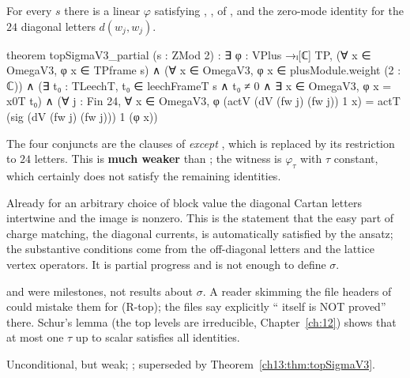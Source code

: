 \begin{theorem}\label{ch13:thm:partial}
For every $s$ there is a linear $\varphi$ satisfying , ,
 of , and the zero-mode identity for the $24$ diagonal letters
$d(w_j,w_j)$.
\end{theorem}
\begin{leancode}
theorem topSigmaV3_partial (s : ZMod 2) :
    ∃ φ : VPlus →ₗ[ℂ] TP, (∀ x ∈ OmegaV3, φ x ∈ TPframe s) ∧
      (∀ x ∈ OmegaV3, φ x ∈ plusModule.weight (2 : ℂ)) ∧
      (∃ t₀ : TLeechT, t₀ ∈ leechFrameT s ∧ t₀ ≠ 0 ∧ ∃ x ∈ OmegaV3, φ x = x0T t₀) ∧
      (∀ j : Fin 24, ∀ x ∈ OmegaV3,
        φ (actV (dV (fw j) (fw j)) 1 x) = actT (sig (dV (fw j) (fw j))) 1 (φ x))
\end{leancode}
\begin{dictionary}
The four conjuncts are the clauses of  \emph{except} , which is
replaced by its restriction to $24$ letters. This is \textbf{much weaker} than ; the
witness is $\varphi_\tau$ with $\tau$ constant, which certainly does not satisfy the remaining identities.
\end{dictionary}
\begin{physics}
Already for an arbitrary choice of block value the diagonal Cartan letters intertwine and the image is nonzero. This is the statement that the easy part of charge matching, the diagonal currents, is automatically satisfied by the ansatz; the substantive conditions come from the off-diagonal letters and the lattice vertex operators. It is partial progress and is not enough to define $\sigma$.
\end{physics}
\begin{warning}
 and  were milestones, not results about $\sigma$. A
reader skimming the file headers of  could mistake them for (R-top); the files
say explicitly `` itself is NOT proved'' there. Schur's lemma (the top levels are
irreducible, Chapter~\ref{ch:12}) shows that at most one $\tau$ up to scalar satisfies all identities.
\end{warning}
\begin{status}Unconditional, but weak; ; superseded by
Theorem~\ref{ch13:thm:topSigmaV3}.\end{status}

